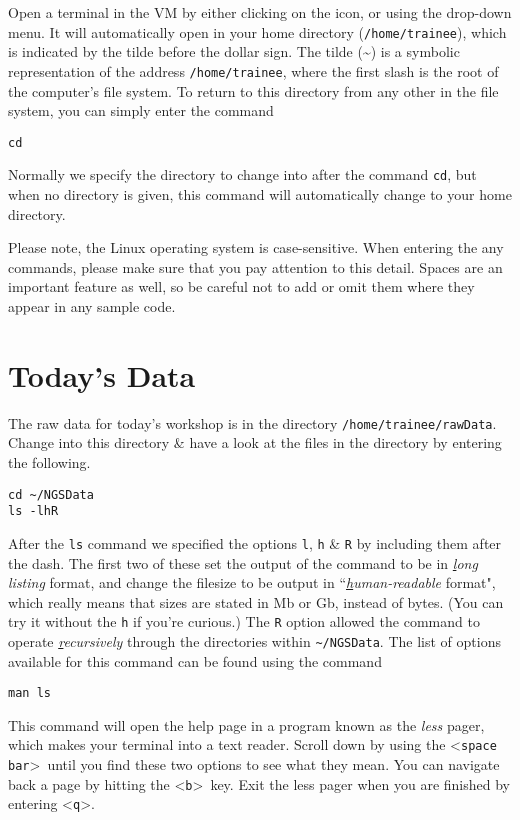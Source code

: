 \begin{steps}
Open a terminal in the VM by either clicking on the icon, or using the drop-down menu.
It will automatically open in your home directory (\texttt{/home/trainee}), which is indicated by the tilde before the dollar sign.
The tilde (\~{}) is a symbolic representation of the address \texttt{/home/trainee}, where the first slash is the root of the computer’s file system.
To return to this directory from any other in the file system, you can simply enter the command
\begin{lstlisting}
cd 
\end{lstlisting}
\end{steps}


Normally we specify the directory to change into after the command \texttt{cd}, but when no directory is given, this command will automatically change to your home directory.\\

\begin{warning}
Please note, the Linux operating system is case-sensitive.
When entering the any commands, please make sure that you pay attention to this detail.
Spaces are an important feature as well, so be careful not to add or omit them where they appear in any sample code.
\end{warning}

\section{Today's Data}
\begin{steps}
The raw data for today's workshop is in the directory \texttt{/home/trainee/rawData}.
Change into this directory \& have a look at the files in the directory by entering the following.
\begin{lstlisting}
cd ~/NGSData
ls -lhR
\end{lstlisting}
\end{steps}

After the \texttt{ls} command we specified the options \texttt{l}, \texttt{h} \& \texttt{R} by including them after the dash.
The first two of these set the output of the command to be in \textit{\underline{l}ong listing} format, and change the filesize to be output in ``\textit{\underline{h}uman-readable} format", which really means that sizes are stated in Mb or Gb, instead of bytes.
(You can try it without the \texttt{h} if you're curious.)
The \texttt{R} option allowed the command to operate \textit{\underline{r}ecursively} through the directories within \texttt{\~{}/NGSData}.
The list of options available for this command can be found using the command
\begin{lstlisting}
man ls
\end{lstlisting}
This command will open the help page in a program known as the \textit{less} pager, which makes your terminal into a text reader.
Scroll down by using the \textless \texttt{space bar}\textgreater \ until you find these two options to see what they mean.
You can navigate back a page by hitting the \textless \texttt{b}\textgreater \ key.
Exit the less pager when you are finished by entering \textless \texttt{q}\textgreater .